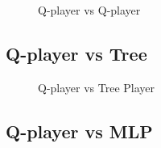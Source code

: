 \documentclass{article}
\begin{document}
\begin{figure}[H]
  \centering
  \caption{Q-player vs Q-player}
  \label{fig:q_player_vs_q_player}
\end{figure}

\subsection{Q-player vs Tree}

\begin{figure}[H]
  \centering
  \caption{Q-player vs Tree Player}
  \label{fig:q_player_vs_tree}
\end{figure}

\subsection{Q-player vs MLP}
\end{document}
